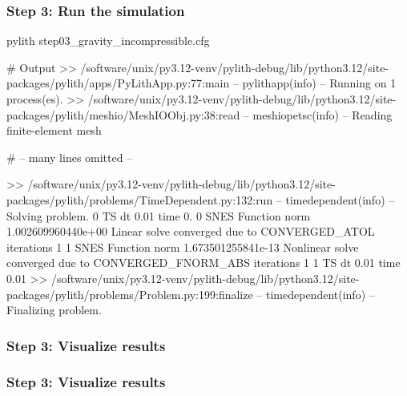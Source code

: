 \documentclass[aspectratio=169]{beamer}
\begin{document}
\begin{frame}[fragile]
  \frametitle{Step 3: Run the simulation}
  \summary{}

\begin{bashcode}
pylith step03_gravity_incompressible.cfg

# Output
 >> /software/unix/py3.12-venv/pylith-debug/lib/python3.12/site-packages/pylith/apps/PyLithApp.py:77:main
 -- pylithapp(info)
 -- Running on 1 process(es).
 >> /software/unix/py3.12-venv/pylith-debug/lib/python3.12/site-packages/pylith/meshio/MeshIOObj.py:38:read
 -- meshiopetsc(info)
 -- Reading finite-element mesh

# -- many lines omitted --

 >> /software/unix/py3.12-venv/pylith-debug/lib/python3.12/site-packages/pylith/problems/TimeDependent.py:132:run
 -- timedependent(info)
 -- Solving problem.
0 TS dt 0.01 time 0.
    0 SNES Function norm 1.002609960440e+00
      Linear solve converged due to CONVERGED_ATOL iterations 1
    1 SNES Function norm 1.673501255841e-13
    Nonlinear solve converged due to CONVERGED_FNORM_ABS iterations 1
1 TS dt 0.01 time 0.01
 >> /software/unix/py3.12-venv/pylith-debug/lib/python3.12/site-packages/pylith/problems/Problem.py:199:finalize
 -- timedependent(info)
 -- Finalizing problem.
\end{bashcode}
  
\end{frame}


\begin{frame}
  \frametitle{Step 3: Visualize results}

    
\end{frame}


\begin{frame}
  \frametitle{Step 3: Visualize results}

    
\end{frame}
\end{document}
